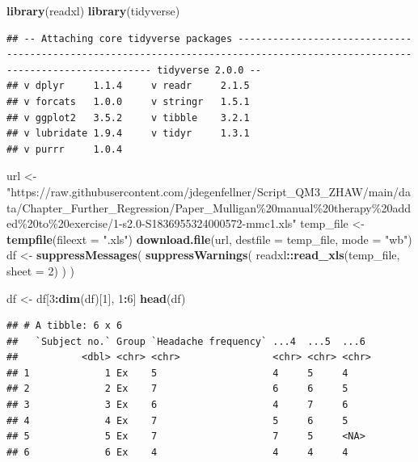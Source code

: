 \documentclass[
]{article}
\newenvironment{Shaded}{\begin{snugshade}}{\end{snugshade}}
\newcommand{\AttributeTok}[1]{\textcolor[rgb]{0.13,0.29,0.53}{#1}}
\newcommand{\DecValTok}[1]{\textcolor[rgb]{0.00,0.00,0.81}{#1}}
\newcommand{\FunctionTok}[1]{\textcolor[rgb]{0.13,0.29,0.53}{\textbf{#1}}}
\newcommand{\NormalTok}[1]{#1}
\newcommand{\OtherTok}[1]{\textcolor[rgb]{0.56,0.35,0.01}{#1}}
\newcommand{\SpecialCharTok}[1]{\textcolor[rgb]{0.81,0.36,0.00}{\textbf{#1}}}
\newcommand{\StringTok}[1]{\textcolor[rgb]{0.31,0.60,0.02}{#1}}
\begin{document}
\begin{Shaded}
\begin{Highlighting}[]
\FunctionTok{library}\NormalTok{(readxl)}
\FunctionTok{library}\NormalTok{(tidyverse)}
\end{Highlighting}
\end{Shaded}

\begin{verbatim}
## -- Attaching core tidyverse packages ----------------------------------------------------------------------------------------------------------------------------- tidyverse 2.0.0 --
## v dplyr     1.1.4     v readr     2.1.5
## v forcats   1.0.0     v stringr   1.5.1
## v ggplot2   3.5.2     v tibble    3.2.1
## v lubridate 1.9.4     v tidyr     1.3.1
## v purrr     1.0.4
\end{verbatim}

\begin{Shaded}
\begin{Highlighting}[]
\NormalTok{url }\OtherTok{\textless{}{-}} \StringTok{"https://raw.githubusercontent.com/jdegenfellner/Script\_QM3\_ZHAW/main/data/Chapter\_Further\_Regression/Paper\_Mulligan\%20manual\%20therapy\%20added\%20to\%20exercise/1{-}s2.0{-}S1836955324000572{-}mmc1.xls"}
\NormalTok{temp\_file }\OtherTok{\textless{}{-}} \FunctionTok{tempfile}\NormalTok{(}\AttributeTok{fileext =} \StringTok{".xls"}\NormalTok{)}
\FunctionTok{download.file}\NormalTok{(url, }\AttributeTok{destfile =}\NormalTok{ temp\_file, }\AttributeTok{mode =} \StringTok{"wb"}\NormalTok{)}
\NormalTok{df }\OtherTok{\textless{}{-}} \FunctionTok{suppressMessages}\NormalTok{(}
  \FunctionTok{suppressWarnings}\NormalTok{(}
\NormalTok{    readxl}\SpecialCharTok{::}\FunctionTok{read\_xls}\NormalTok{(temp\_file, }\AttributeTok{sheet =} \DecValTok{2}\NormalTok{)}
\NormalTok{  )}
\NormalTok{)}

\NormalTok{df }\OtherTok{\textless{}{-}}\NormalTok{ df[}\DecValTok{3}\SpecialCharTok{:}\FunctionTok{dim}\NormalTok{(df)[}\DecValTok{1}\NormalTok{], }\DecValTok{1}\SpecialCharTok{:}\DecValTok{6}\NormalTok{]}
\FunctionTok{head}\NormalTok{(df)}
\end{Highlighting}
\end{Shaded}

\begin{verbatim}
## # A tibble: 6 x 6
##   `Subject no.` Group `Headache frequency` ...4  ...5  ...6 
##           <dbl> <chr> <chr>                <chr> <chr> <chr>
## 1             1 Ex    5                    4     5     4    
## 2             2 Ex    7                    6     6     5    
## 3             3 Ex    6                    4     7     6    
## 4             4 Ex    7                    5     6     5    
## 5             5 Ex    7                    7     5     <NA> 
## 6             6 Ex    4                    4     4     4
\end{verbatim}
\end{document}
